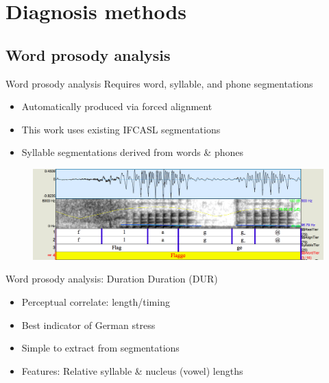 \documentclass[xcolor={dvipsnames}]{beamer}
\newcommand{\TODO}[1]{{\color{red}\textbf{[TODO #1]}}}
\begin{document}

\section{Diagnosis methods}
	\subsection{Word prosody analysis}
		\begin{frame}{Word prosody analysis}
		Requires word, syllable, and phone segmentations
			\begin{itemize}
			\item Automatically produced via forced alignment
			\item This work uses existing IFCASL segmentations
			\item Syllable segmentations derived from words \& phones
			\end{itemize}
			
			\begin{figure}
			\includegraphics[width=\textwidth]{2SH05_FGMB1_527-flagge}
			\end{figure}
		\end{frame}
		
		\begin{frame}{Word prosody analysis: Duration}
		Duration (DUR)
			\begin{itemize}
			\item Perceptual correlate: length/timing
			\item Best indicator of German stress
			\item Simple to extract from segmentations
			\item Features: Relative syllable \& nucleus (vowel) lengths
			\end{itemize}
				
		\end{frame}		
		
\end{document}
